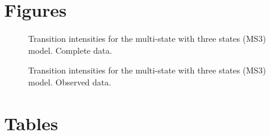 \documentclass{bmcart}
\begin{document}
\begin{backmatter}



\section*{Figures}
\begin{figure}[!ht]
  \caption{%
           Transition intensities for the multi-state with three states (MS3) model. Complete
           data.}
  \label{fig:trans_complete}
\end{figure}

\begin{figure}[!ht]
  \caption{Transition intensities for the multi-state with three states (MS3) model. Observed data.}
  \label{fig:trans_observed}
\end{figure}


\section*{Tables}


\end{backmatter}
\end{document}
